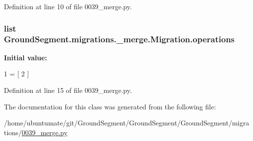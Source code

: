 Definition at line 10 of file 0039\+\_\+merge.\+py.

\hypertarget{class_ground_segment_1_1migrations_1_10039__merge_1_1_migration_a188fcb0bf9e1058b1d870d765532f255}{}
\subsubsection[{operations}]{\setlength{\rightskip}{0pt plus 5cm}list Ground\+Segment.\+migrations.\+\_\+merge.\+Migration.\+operations\hspace{0.3cm}{\ttfamily [static]}}\label{class_ground_segment_1_1migrations_1_10039__merge_1_1_migration_a188fcb0bf9e1058b1d870d765532f255}
{\bfseries Initial value\+:}
\begin{DoxyCode}
1 = [
2     ]
\end{DoxyCode}


Definition at line 15 of file 0039\+\_\+merge.\+py.



The documentation for this class was generated from the following file\+:\begin{DoxyCompactItemize}
\item 
/home/ubuntumate/git/\+Ground\+Segment/\+Ground\+Segment/\+Ground\+Segment/migrations/\hyperlink{0039__merge_8py}{0039\+\_\+merge.\+py}\end{DoxyCompactItemize}
